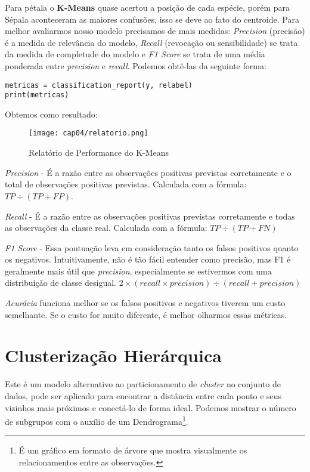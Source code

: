 Para pétala o \textbf{K-Means} quase acertou a posição de cada espécie, porém para Sépala aconteceram as maiores confusões, isso se deve ao fato do centroide. Para melhor avaliarmos nosso modelo precisamos de mais medidas: \textit{Precision} (precisão) é a medida de relevância do modelo, \textit{Recall} (revocação ou sensibilidade) se trata da medida de completude do modelo e \textit{F1 Score} se trata de uma média ponderada entre \textit{precision} e \textit{recall}. Podemos obtê-las da seguinte forma:
\begin{lstlisting}[]
metricas = classification_report(y, relabel)
print(metricas)
\end{lstlisting}

Obtemos como resultado:
\begin{figure}[H]
	\centering
	\texttt{[image: cap04/relatorio.png]}
	\caption{Relatório de Performance do K-Means}
\end{figure}

\textit{Precision} - É a razão entre as observações positivas previstas corretamente e o total de observações positivas previstas. Calculada com a fórmula: $TP \div (TP + FP)$.

\textit{Recall} - É a razão entre as observações positivas previstas corretamente e todas as observações da classe real. Calculada com a fórmula: $TP \div (TP + FN)$

\textit{F1 Score} - Essa pontuação leva em consideração tanto os falsos positivos quanto os negativos. Intuitivamente, não é tão fácil entender como precisão, mas F1 é geralmente mais útil que \textit{precision}, especialmente se estivermos com uma distribuição de classe desigual. $2 \times (recall \times precision) \div (recall + precision)$

\textit{Acurácia} funciona melhor se os falsos positivos e negativos tiverem um custo semelhante. Se o custo for muito diferente, é melhor olharmos essas métricas. 

\section{Clusterização Hierárquica}
Este é um modelo alternativo ao particionamento de \textit{cluster} no conjunto de dados, pode ser aplicado para encontrar a distância entre cada ponto e seus vizinhos mais próximos e conectá-lo de forma ideal. Podemos mostrar o número de subgrupos com o auxílio de um Dendrograma\footnote{É um gráfico em formato de árvore que mostra visualmente os relacionamentos entre as observações.}. 


